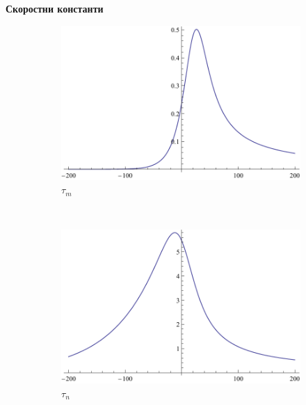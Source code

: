 \documentclass{article}
\numberwithin{equation}{section}
\begin{document}
    \textbf{Скоростни константи}
    
    \begin{figure}[H]
        \centering
        \begin{subfigure}[t]{0.3\textwidth}
            \includegraphics[width=\textwidth]{./schemas/tm.pdf}
            \caption{$\tau_m$}
        \end{subfigure}
        ~ %
        \begin{subfigure}[t]{0.3\textwidth}
            \includegraphics[width=\textwidth]{./schemas/tn.pdf}
            \caption{$\tau_n$}
        \end{subfigure}
        ~ %
        \begin{subfigure}[t]{0.3\textwidth}

\end{subfigure}
\end{figure}
\end{document}
